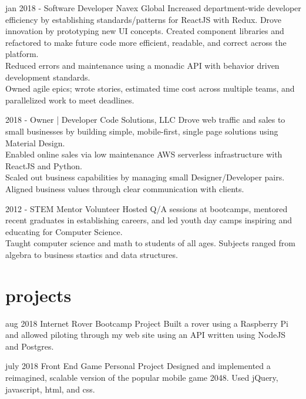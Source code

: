 \documentclass[]{friggeri-cv}
\begin{document}
\begin{entrylist}
  \entry 
    {jan 2018 -}
    {Software Developer}
    {Navex Global}
    {Increased department-wide developer efficiency by establishing standards/patterns for ReactJS with Redux. Drove innovation by prototyping new UI concepts. Created component libraries and refactored to make future code more efficient, readable, and correct across the platform.\\
    Reduced errors and maintenance using a monadic API with behavior driven development standards.\\
    Owned agile epics; wrote stories, estimated time cost across multiple teams, and parallelized work to meet deadlines.
    }
  
  \entry 
    {2018 - }
    {Owner | Developer}
    {Code Solutions, LLC}
    {Drove web traffic and sales to small businesses by building simple, mobile-first, single page solutions using Material Design. \\
    Enabled online sales via low maintenance AWS serverless infrastructure with ReactJS and Python. \\
    Scaled out business capabilities by managing small Designer/Developer pairs. Aligned business values through clear communication with clients.}

 
  \entry
    {2012 -}
    {STEM Mentor Volunteer}
    {}
    {Hosted Q/A sessions at bootcamps, mentored recent graduates in establishing careers, and led youth day camps inspiring and educating for Computer Science.\\
    Taught computer science and math to students of all ages. Subjects ranged from algebra to business stastics and data structures.}

%
  

\end{entrylist}

\section{projects}

\begin{entrylist}

  \entry
    {aug 2018}
    {Internet Rover}
    {Bootcamp Project}
    {Built a rover using a Raspberry Pi and allowed piloting through my web site using an API written using NodeJS and Postgres.}

  \entry
    {july 2018}
    {Front End Game}
    {Personal Project}
    {Designed and implemented a reimagined, scalable version of the popular mobile game 2048. Used jQuery, javascript, html, and css.}

\end{entrylist}
\end{document}
